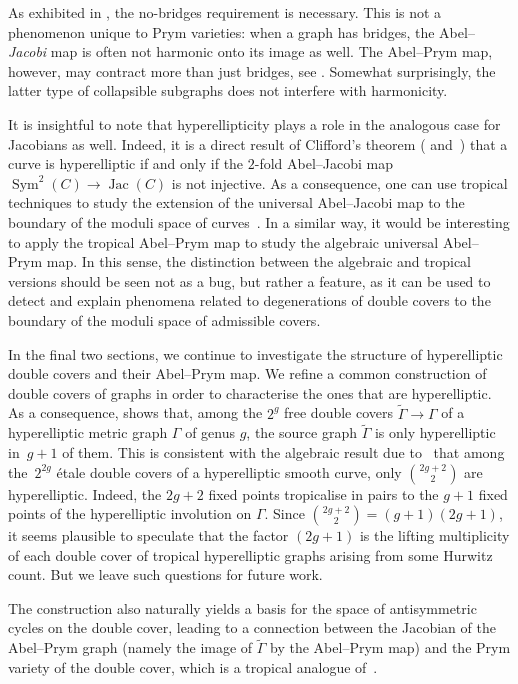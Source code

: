 \documentclass[11pt]{article}
\theoremstyle{definition}
\numberwithin{equation}{section}
\theoremstyle{definition}
\newcommand{\tGa}{\widetilde{\Gamma}}
\newcommand{\Ga}{\Gamma}
\DeclareMathOperator{\Sym}{Sym}
\newcommand{\wt}[1]{\widetilde{#1}}
\DeclareMathOperator{\Jac}{Jac}
\begin{document}
As exhibited in , the no-bridges requirement is necessary. This is not a phenomenon 
unique to Prym varieties: when a graph has bridges, the Abel--\emph{Jacobi} map is often not harmonic onto its image as well. The Abel--Prym map, however, may contract more than just bridges, see .
Somewhat surprisingly, the latter type of collapsible subgraphs does not interfere with harmonicity. 
    

It is insightful to note that hyperellipticity plays a role in the analogous case for Jacobians as well. Indeed,  it is a direct result of Clifford's theorem (\cite[Chapter III]{ACGHI}  and~\cite{Coppens_Clifford,Len_Clifford}) that a curve is  hyperelliptic if and only if the $2$-fold Abel--Jacobi map $\Sym^2(C)\to\Jac(C)$ is not injective. As a consequence, one can use  tropical techniques to study the extension of the  
universal Abel--Jacobi map to the boundary of the moduli space of curves~\cite{AbreuAndriaPacini_AbelMaps}. In a similar way, it would be interesting to apply the tropical Abel--Prym map to study the algebraic universal Abel--Prym map. 
In this sense, the distinction between the algebraic and tropical versions should be seen not as a bug, but rather a feature, as it can be used to detect and explain phenomena related to  degenerations of double covers to the boundary of the moduli space of admissible covers. 


In the final two sections, we continue to investigate the structure of hyperelliptic double covers and their Abel--Prym map. We refine a common construction of double covers of graphs in order to characterise the ones that are hyperelliptic. 
As a consequence,   shows that, among the $2^g$ free double covers $\tGa\to \Ga$ of a hyperelliptic metric graph $\Ga$ of genus $g$, the source graph $\wt\Gamma$ is only hyperelliptic in~$g+1$ of them. 
This is consistent with the algebraic result due to~\cite{HMfarkashypcovers} that among the~$2^{2g}$ \'etale double covers of a hyperelliptic smooth curve, only $\binom{2g+2}{2}$ are hyperelliptic. Indeed, the $2g+2$ fixed points tropicalise in pairs to the $g+1$ fixed points of the hyperelliptic involution on $\Ga$.
Since $\binom{2g+2}{2}=(g+1)(2g+1)$, it seems plausible to speculate that the factor $(2g+1)$ is the lifting multiplicity of each double cover of  tropical hyperelliptic graphs arising from some Hurwitz count. But we leave such questions for future work. 


The construction also naturally yields a basis for the space of antisymmetric cycles on the double cover, leading to a connection between the Jacobian of the Abel--Prym graph (namely the image of $\wt\Gamma$ by the Abel--Prym map) and the Prym variety of  the double cover, which is  a tropical analogue of~\cite[Corollary 12.5.7]{BL04}. 
\end{document}
